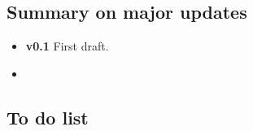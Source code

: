 
\subsection*{Summary on major updates}

\begin{itemize}
\item \textbf{v0.1} First draft.

\item

\end{itemize}

\subsection*{To do list}

